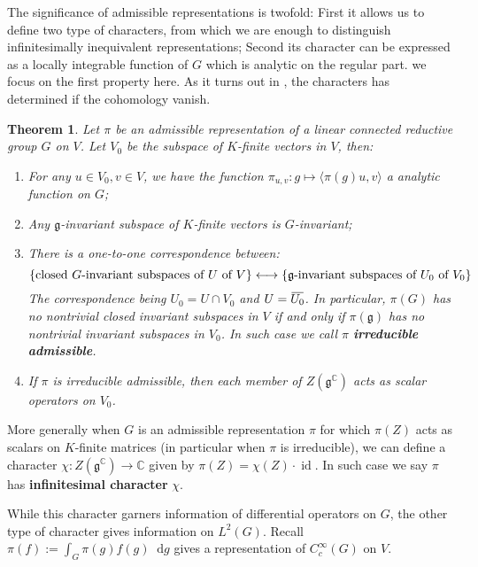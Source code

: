 \documentclass[11pt]{report}
\theoremstyle{definition}
\theoremstyle{plain}
\newtheorem{Theo}[Def]{Theorem}
\DeclareMathOperator{\id}{id}
\newcommand{\complex}{\mathbb{C}}
\newcommand{\overbar}[1]{\mkern 1.5mu\overline{\mkern-1.5mu#1\mkern-1.5mu}\mkern 1.5mu}
\newcommand{\brac}[1]{\langle #1 \rangle}
\renewcommand{\bar}{\overbar}
\newcommand{\mass}[1]{\mathop{}\mathrm{d}{#1}}
\newcommand{\Lie}[1]{\mathfrak{#1}}
\begin{document}
\par The significance of admissible representations is twofold: First it allows us to define two type of characters, from which we are enough to distinguish infinitesimally inequivalent representations; Second its character can be expressed as a locally integrable function of $G$ which is analytic on the regular part. we focus on the first property here. As it turns out in , the characters has determined if the cohomology vanish.
\begin{Theo}\label{knapp8.7}
	\textnormal{\cite[Theorem~8.7 \& 8.9; Corollary 8.10 \& 8.14]{knapp2016}} Let $\pi$ be an admissible representation of a linear connected reductive group $G$ on $V$. Let $V_0$ be the subspace of $K$-finite vectors in $V$, then:
	\begin{enumerate}
		\item For any $u\in V_0, v\in V$, we have the function $\pi_{u,v}:g\mapsto \brac{\pi(g)u,v}$ a analytic function on $G$;
		\item Any $\Lie{g}$-invariant subspace of $K$-finite vectors is $G$-invariant;
		\item There is a one-to-one correspondence between:
		\begin{equation*}
		\{\textnormal{closed $G$-invariant subspaces of $U$ of $V$}\}\longleftrightarrow \{\textnormal{$\Lie{g}$-invariant subspaces of $U_0$ of $V_0$}\}
		\end{equation*}
		The correspondence being $U_0=U\cap V_0$ and $U=\bar{U_0}$. In particular, $\pi(G)$ has no nontrivial closed invariant subspaces in $V$ if and only if $\pi(\Lie{g})$ has no nontrivial invariant subspaces in $V_0$. In such case we call $\pi$ \textbf{irreducible admissible}.
		\item If $\pi$ is irreducible admissible, then each member of $Z(\Lie{g}^\complex)$ acts as scalar operators on $V_0$. 
	\end{enumerate}
\end{Theo}
More generally  when $G$ is an admissible representation $\pi$ for which $\pi(Z)$ acts as scalars on $K$-finite matrices (in particular when $\pi$ is irreducible), we can define a character $\chi:Z(\Lie{g}^\complex)\to \complex$ given by $\pi(Z)=\chi(Z)\cdot \id$. In such case we say $\pi$ has \textbf{infinitesimal character} $\chi$.
\par While this character garners information of differential operators on $G$, the other type of character gives information on $L^2(G)$. Recall $\pi(f):=\int_G \pi(g)f(g)\mass{g}$ gives a representation of $C^\infty_c(G)$ on $V$.
\end{document}
